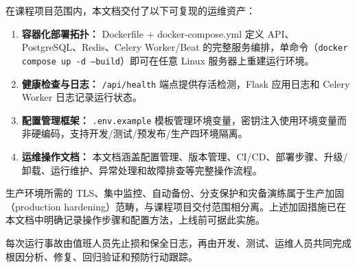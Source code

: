 \documentclass[12pt,a4paper]{ctexart}
\begin{document}
在课程项目范围内，本文档交付了以下可复现的运维资产：
\begin{enumerate}
\item \textbf{容器化部署拓扑：} Dockerfile + docker-compose.yml 定义 API、PostgreSQL、Redis、Celery Worker/Beat 的完整服务编排，单命令（\texttt{docker compose up -d --build}）即可在任意 Linux 服务器上重建运行环境。
\item \textbf{健康检查与日志：} \texttt{/api/health} 端点提供存活检测，Flask 应用日志和 Celery Worker 日志记录运行状态。
\item \textbf{配置管理框架：} \texttt{.env.example} 模板管理环境变量，密钥注入使用环境变量而非硬编码，支持开发/测试/预发布/生产四环境隔离。
\item \textbf{运维操作文档：} 本文档涵盖配置管理、版本管理、CI/CD、部署步骤、升级/卸载、运行维护、异常处理和故障排查等完整操作流程。
\end{enumerate}
生产环境所需的 TLS、集中监控、自动备份、分支保护和灾备演练属于生产加固（production hardening）范畴，与课程项目交付范围相分离。上述加固措施已在本文档中明确记录操作步骤和配置方法，上线前可据此实施。

每次运行事故由值班人员先止损和保全日志，再由开发、测试、运维人员共同完成根因分析、修复、回归验证和预防行动跟踪。
\end{document}
